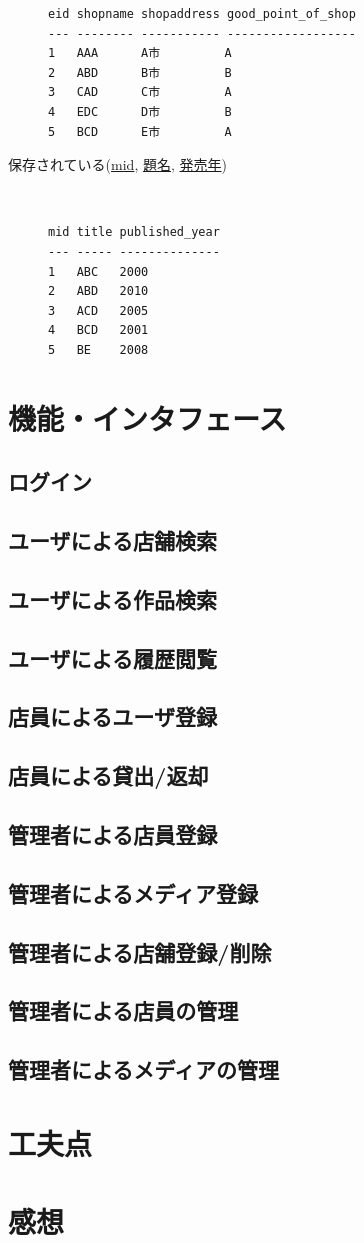 \documentclass{jarticle}
\begin{document}
\begin{description}
\begin{verbatim}
eid shopname shopaddress good_point_of_shop
--- -------- ----------- ------------------
1   AAA      A市         A
2   ABD      B市         B
3   CAD      C市         A
4   EDC      D市         B
5   BCD      E市         A
\end{verbatim}
\item[保存されている(\underline{mid}, \underline{題名}, \underline{発売年})] \leavevmode \\
\begin{verbatim}
mid title published_year
--- ----- --------------
1   ABC   2000
2   ABD   2010
3   ACD   2005
4   BCD   2001
5   BE    2008
\end{verbatim}
\end{description}

\section{機能・インタフェース}
\subsection{ログイン}
\subsection{ユーザによる店舗検索}
\subsection{ユーザによる作品検索}
\subsection{ユーザによる履歴閲覧}
\subsection{店員によるユーザ登録}
\subsection{店員による貸出/返却}
\subsection{管理者による店員登録}
\subsection{管理者によるメディア登録}
\subsection{管理者による店舗登録/削除}
\subsection{管理者による店員の管理}
\subsection{管理者によるメディアの管理}

\section{工夫点}


\section{感想}
\end{document}
